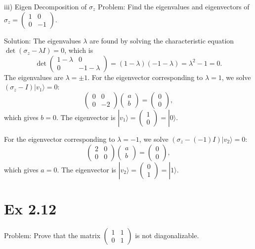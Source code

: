 \documentclass{article}
\newcommand{\0}{{$|0\rangle$}}
\newcommand{\1}{{$|1\rangle$}}
\begin{document}
iii) Eigen Decomposition of $ \sigma_z $  
Problem: Find the eigenvalues and eigenvectors of $ \sigma_z = \begin{pmatrix} 1 & 0 \\ 0 & -1 \end{pmatrix} $.  

Solution: The eigenvalues $ \lambda $ are found by solving the characteristic equation  
$ \det(\sigma_z - \lambda I) = 0 $, which is  
$$
\det \begin{pmatrix} 1-\lambda & 0 \\ 0 & -1-\lambda \end{pmatrix} = (1-\lambda)(-1-\lambda) = \lambda^2 - 1 = 0.
$$
The eigenvalues are $ \lambda = \pm 1 $. For the eigenvector corresponding to $ \lambda = 1 $, we solve  
$ (\sigma_z - I) |v_1 \rangle = 0 $:  
$$
\begin{pmatrix} 0 & 0 \\ 0 & -2 \end{pmatrix} \begin{pmatrix} a \\ b \end{pmatrix} = \begin{pmatrix} 0 \\ 0 \end{pmatrix},
$$
which gives $ b=0 $. The eigenvector is  
$ |v_1 \rangle = \begin{pmatrix} 1 \\ 0 \end{pmatrix} = |0 \rangle $.  

For the eigenvector corresponding to $ \lambda = -1 $, we solve  
$ (\sigma_z - (-1) I) |v_2 \rangle = 0 $:  
$$
\begin{pmatrix} 2 & 0 \\ 0 & 0 \end{pmatrix} \begin{pmatrix} a \\ b \end{pmatrix} = \begin{pmatrix} 0 \\ 0 \end{pmatrix},
$$
which gives $ a=0 $. The eigenvector is  
$ |v_2 \rangle = \begin{pmatrix} 0 \\ 1 \end{pmatrix} = |1 \rangle $.


\newpage
\section*{Ex 2.12  }
Problem: Prove that the matrix $ \begin{pmatrix} 1 & 1 \\ 0 & 1 \end{pmatrix} $ is not diagonalizable.  
\end{document}
